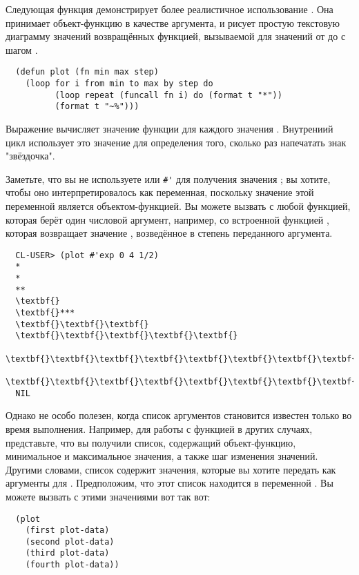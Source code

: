 Следующая функция демонстрирует более реалистичное использование .  Она
принимает объект-функцию в качестве аргумента, и рисует простую текстовую диаграмму
значений возвращённых функцией, вызываемой для значений от  до  с
шагом .

\begin{lstlisting}
  (defun plot (fn min max step)
    (loop for i from min to max by step do
          (loop repeat (funcall fn i) do (format t "*"))
          (format t "~%")))
\end{lstlisting}

Выражение  вычисляет значение функции для каждого значения .
Внутрениий цикл использует это значение для определения того, сколько раз напечатать знак
"звёздочка".

Заметьте, что вы не используете  или \lstinline!#'! для получения значения
; вы хотите, чтобы оно интерпретировалось как переменная, поскольку значение этой
переменной является объектом-функцией.  Вы можете вызвать  с любой функцией,
которая берёт один числовой аргумент, например, со встроенной функцией , которая
возвращает значение , возведённое в степень переданного аргумента.

\begin{verbatim}
  CL-USER> (plot #'exp 0 4 1/2)
  *
  *
  **
  \textbf{}
  \textbf{}***
  \textbf{}\textbf{}\textbf{}
  \textbf{}\textbf{}\textbf{}\textbf{}\textbf{}
  \textbf{}\textbf{}\textbf{}\textbf{}\textbf{}\textbf{}\textbf{}\textbf{}*
  \textbf{}\textbf{}\textbf{}\textbf{}\textbf{}\textbf{}\textbf{}\textbf{}\textbf{}\textbf{}\textbf{}\textbf{}\textbf{}**
  NIL
\end{verbatim}

Однако  не особо полезен, когда список аргументов становится известен только
во время выполнения.  Например, для работы с функцией  в других случаях,
представьте, что вы получили список, содержащий объект-функцию, минимальное и максимальное
значения, а также шаг изменения значений.  Другими словами, список содержит значения,
которые вы хотите передать как аргументы для .  Предположим, что этот список
находится в переменной .  Вы можете вызвать  с этими значениями
вот так вот:

\begin{lstlisting}
  (plot 
    (first plot-data) 
    (second plot-data) 
    (third plot-data) 
    (fourth plot-data))
\end{lstlisting}

